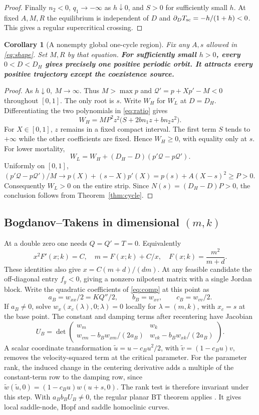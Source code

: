 \documentclass[12pt,a4paper,twoside,fleqn]{article}
\theoremstyle{journal}
\newtheorem{corollary}{Corollary}
\newcommand{\claim}[1]{{\normalfont\bfseries\boldmath #1}}
\newcommand{\Q}{\mathcal Q}
\begin{document}
\begin{proof}
Finally \(n_2<0\), \(q_1\to-\infty\) as \(h\downarrow0\), and \(S>0\) for sufficiently small \(h\). At fixed \(A,M,R\) the equilibrium is independent of \(D\) and \(\partial_D T_{\rm sc}=-h/(1+h)<0\). This gives a regular supercritical crossing.
\end{proof}

\begin{corollary}[A nonempty global one-cycle region]\label{cor:unique}
Fix any \(A,s\) allowed in \eqref{eq:shape}. Set \(M,R\) by that equation.
\claim{For sufficiently small \(h>0\), every \(0<D<D_H\) gives precisely one positive periodic orbit. It attracts every positive trajectory except the coexistence source.}
\end{corollary}
\begin{proof}
As \(h\downarrow0,\ M\to\infty\). Thus \(M>\max p\) and \(\Q'=p+Xp'-M<0\) throughout \([0,1]\). The only root is \(s\). Write \(W_H\) for \(W_L\) at \(D=D_H\). Differentiating the two polynomials in \eqref{eq:ratio} gives
\[
 W_H=MP^2 z^2\big(S+2bn_1z+bn_2z^2\big).
\]
For \(X\in[0,1]\), \(z\) remains in a fixed compact interval. The first term \(S\) tends to \(+\infty\) while the other coefficients are fixed. Hence \(W_H\ge0\), with equality only at \(s\). For lower mortality,
\[
 W_L=W_H+(D_H-D)(p'\Q-p\Q').
\]
Uniformly on \([0,1]\), \((p'\Q-p\Q')/M\to p(X)+(s-X)p'(X)=p(s)+A(X-s)^2\ge P>0\). Consequently \(W_L>0\) on the entire strip. Since \(N(s)=(D_H-D)P>0\), the conclusion follows from Theorem~\ref{thm:cycle}.
\end{proof}
\subsection{Bogdanov--Takens in dimensional \texorpdfstring{\((m,k)\)}{(m,k)}}
At a double zero one needs \(Q=Q'=T=0\). Equivalently
\[
 x^2F'(x;k)=C,\quad m=F(x;k)+C/x,\quad
 F(x;k)=\frac{m^2}{m+d}.
\]
These identities also give \(x=C(m+d)/(dm)\). At any feasible candidate the off-diagonal entry \(f_y<0\), giving a nonzero nilpotent matrix with a single Jordan block. Write the quadratic coefficients of \eqref{eq:comp} at this point as
\[
 a_B=w_{xx}/2=KQ''/2,\qquad b_B=w_{xv},\qquad c_B=w_{vv}/2.
\]
If \(a_B\ne0\), solve \(w_x(x_c(\lambda),0;\lambda)=0\) locally for \(\lambda=(m,k)\), with \(x_c=s\) at the base point. The constant and damping terms after recentering have Jacobian
\begin{equation}\label{eq:U}
 U_B=\det\begin{pmatrix}
 w_m & w_k\\
 w_{vm}-b_Bw_{xm}/(2a_B) & w_{vk}-b_Bw_{xk}/(2a_B)
 \end{pmatrix}.
\end{equation}
A scalar coordinate transformation \(\widetilde u=u-c_Bu^2/2\), with \(\widetilde v=(1-c_Bu)v\), removes the velocity-squared term at the critical parameter. For the parameter rank, the induced change in the centering derivative adds a multiple of the constant-term row to the damping row, since \(\widetilde w(\widetilde u,0)=(1-c_Bu)w(u+s,0)\). The rank test is therefore invariant under this step. With \(a_B b_B U_B\ne0\), the regular planar BT theorem applies \citep{kuznetsov98}. It gives local saddle-node, Hopf and saddle homoclinic curves.
\end{document}
